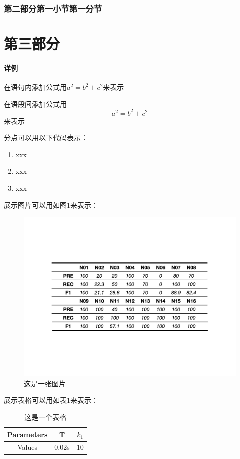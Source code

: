 \documentclass[12pt]{article}
\begin{document}
\subsubsection{\songti{}第二部分第一小节第一分节}
\section{\songti{}第三部分}
\paragraph{\songti{}详例}

\songti{}在语句内添加公式用$a^2=b^2+c^2$来表示

\songti{}在语段间添加公式用$$a^2=b^2+c^2$$来表示

\songti{}分点可以用以下代码表示：
\begin{enumerate}
    \songti{}\item xxx
    \songti{}\item xxx
    \songti{}\item xxx
\end{enumerate}

\songti{}展示图片可以用如图1来表示：
\begin{figure}[H]
    \label{fig:图片}
    \centering
    \includegraphics[scale=0.5,trim=150 220 150 220,clip]{图片.jpeg}
    \caption{\fangsong 这是一张图片}
\end{figure}

\songti{}展示表格可以用如表1来表示：
\begin{table}[H]
    \centering
    \begin{tabular}{ccc}
        \hline
        Parameters & T & $k_1$ \\ 
        \hline
        Values & 0.02s & 10 \\ 
        \hline
    \end{tabular}
    \caption{\fangsong 这是一个表格}
\end{table}
\end{document}
